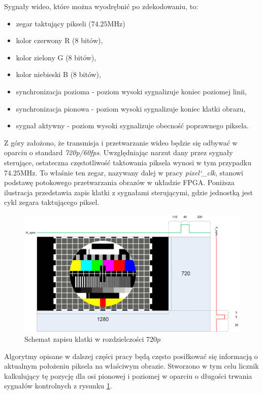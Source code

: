 Sygnały wideo, które można wyodrębnić po zdekodowaniu, to:
\begin{itemize}
	\item zegar taktujący pikseli ($74.25$MHz)
	\item kolor czerwony R (8 bitów),
	\item kolor zielony G (8 bitów),
	\item kolor niebieski B (8 bitów),
	\item synchronizacja pozioma - poziom wysoki sygnalizuje koniec poziomej linii,
	\item synchronizacja pionowa - poziom wysoki sygnalizuje koniec klatki obrazu,
	\item sygnał aktywny - poziom wysoki sygnalizuje obecność poprawnego piksela.
\end{itemize}
Z góry założono, że transmisja i przetwarzanie wideo będzie się odbywać w oparciu o standard \textit{720p/60fps}. Uwzględniając narzut dany przez sygnały sterujące, ostateczna częstotliwość taktowania piksela wynosi w tym przypadku $74.25$MHz. To właśnie ten zegar, nazywany dalej w pracy \textit{\boldmath pixel\char`_clk}, stanowi podstawę potokowego przetwarzania obrazów w układzie FPGA. Poniższa ilustracja przedstawia zapis klatki z sygnałami sterującymi, gdzie jednostką jest cykl zegara taktującego piksel. 

\begin{figure}[h]
	\centering
	\includegraphics[width=17cm]{4_720p.png}
	\caption{Schemat zapisu klatki w rozdzielczości $720p$}
	\label{fig:720_frame}
\end{figure}

Algorytmy opisane w dalszej części pracy będą często posiłkować się informacją o aktualnym położeniu piksela na właściwym obrazie. Stworzono w tym celu licznik kalkulujący tę pozycję dla osi pionowej i poziomej w oparciu o długości trwania sygnałów kontrolnych z rysunku \ref{fig:720_frame}. 

